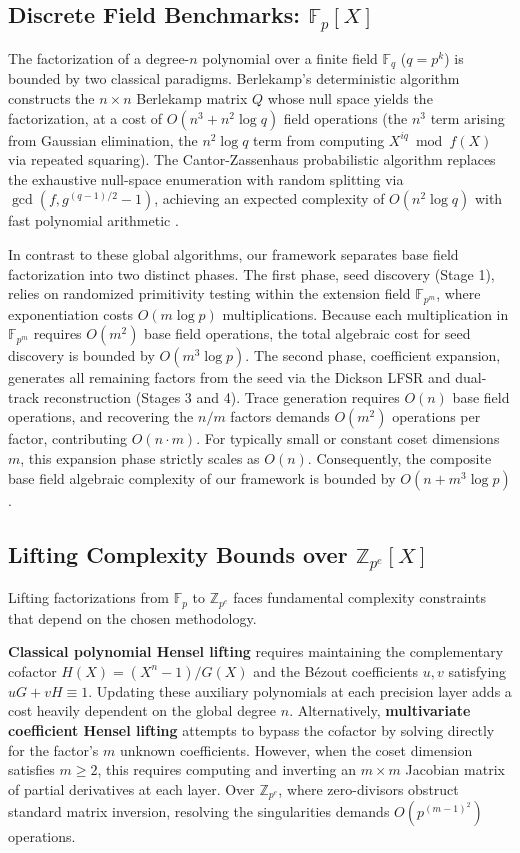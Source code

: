 \documentclass[12pt]{article}
\theoremstyle{plain}
\begin{document}
\subsection{Discrete Field Benchmarks: $\mathbb{F}_p[X]$}
The factorization of a degree-$n$ polynomial over a finite field $\mathbb{F}_q$ ($q = p^k$) is bounded by two classical paradigms. Berlekamp's deterministic algorithm \cite{Berlekamp1968} constructs the $n \times n$ Berlekamp matrix $Q$ whose null space yields the factorization, at a cost of $O(n^3 + n^2 \log q)$ field operations (the $n^3$ term arising from Gaussian elimination, the $n^2 \log q$ term from computing $X^{iq} \bmod f(X)$ via repeated squaring). The Cantor-Zassenhaus probabilistic algorithm \cite{Cantor1981} replaces the exhaustive null-space enumeration with random splitting via $\gcd(f, g^{(q-1)/2} - 1)$, achieving an expected complexity of $O(n^2 \log q)$ with fast polynomial arithmetic \cite{Gathen1998}.

In contrast to these global algorithms, our framework separates base field factorization into two distinct phases. The first phase, seed discovery (Stage 1), relies on randomized primitivity testing within the extension field $\mathbb{F}_{p^m}$, where exponentiation costs $O(m \log p)$ multiplications. Because each multiplication in $\mathbb{F}_{p^m}$ requires $O(m^2)$ base field operations, the total algebraic cost for seed discovery is bounded by $O(m^3 \log p)$. The second phase, coefficient expansion, generates all remaining factors from the seed via the Dickson LFSR and dual-track reconstruction (Stages 3 and 4). Trace generation requires $O(n)$ base field operations, and recovering the $n/m$ factors demands $O(m^2)$ operations per factor, contributing $O(n \cdot m)$. For typically small or constant coset dimensions $m$, this expansion phase strictly scales as $O(n)$. Consequently, the composite base field algebraic complexity of our framework is bounded by $O(n + m^3 \log p)$.

\subsection{Lifting Complexity Bounds over $\mathbb{Z}_{p^e}[X]$}
Lifting factorizations from $\mathbb{F}_p$ to $\mathbb{Z}_{p^e}$ faces fundamental complexity constraints that depend on the chosen methodology.

\textbf{Classical polynomial Hensel lifting} \cite{Cohen1993} requires maintaining the complementary cofactor $H(X) = (X^n-1)/G(X)$ and the B\'{e}zout coefficients $u, v$ satisfying $u G + v H \equiv 1$. Updating these auxiliary polynomials at each precision layer adds a cost heavily dependent on the global degree $n$. Alternatively, \textbf{multivariate coefficient Hensel lifting} attempts to bypass the cofactor by solving directly for the factor's $m$ unknown coefficients. However, when the coset dimension satisfies $m \ge 2$, this requires computing and inverting an $m \times m$ Jacobian matrix of partial derivatives at each layer. Over $\mathbb{Z}_{p^e}$, where zero-divisors obstruct standard matrix inversion, resolving the singularities demands $O(p^{(m-1)^2})$ operations.
\end{document}

